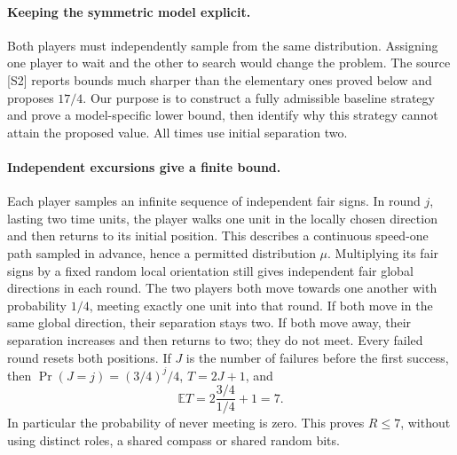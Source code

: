 \documentclass[11pt,a4paper]{article}
\begin{document}
\paragraph{Keeping the symmetric model explicit.}
Both players must independently sample from the same
distribution. Assigning one player to wait and the
other to search would change the problem. The source
[S2] reports bounds much sharper than the elementary
ones proved below and proposes $17/4$. Our purpose
is to construct a fully admissible baseline strategy
and prove a model-specific lower bound, then identify
why this strategy cannot attain the proposed value.
All times use initial separation two.

\paragraph{Independent excursions give a finite bound.}
Each player samples an infinite sequence of independent
fair signs. In round $j$, lasting two time units,
the player walks one unit in the locally chosen
direction and then returns to its initial position.
This describes a continuous speed-one path sampled
in advance, hence a permitted distribution $\mu$.
Multiplying its fair signs by a fixed random local
orientation still gives independent fair global
directions in each round. The two players both
move towards one another with probability $1/4$,
meeting exactly one unit into that round. If both
move in the same global direction, their separation
stays two. If both move away, their separation
increases and then returns to two; they do not meet.
Every failed round resets both positions.
If $J$ is the number of failures before the first
success, then
$\Pr(J=j)=(3/4)^j/4$, $T=2J+1$, and
\[
                 \mathbb E T=2\frac{3/4}{1/4}+1=7.
\]
In particular the probability of never meeting is
zero. This proves $R\le7$, without using distinct
roles, a shared compass or shared random bits.
\end{document}
